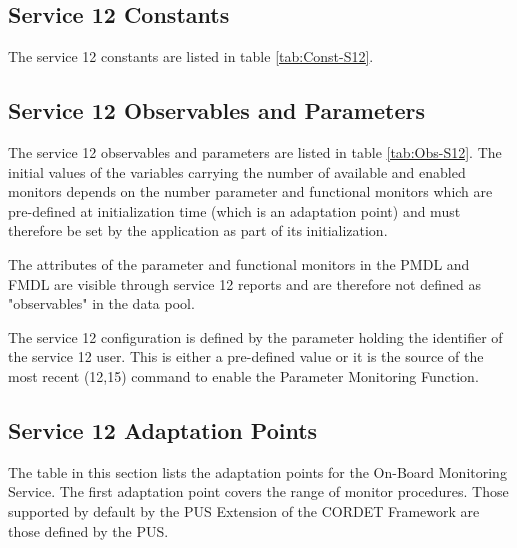 \documentclass{pnp_article}
\begin{document}
\subsection{Service 12 Constants}\label{sec:serv12Const}
The service 12 constants are listed in table \ref{tab:Const-S12}.    



\subsection{Service 12 Observables and Parameters}\label{sec:serv12ObsPar}
The service 12 observables and parameters are listed in table \ref{tab:Obs-S12}. The initial values of the variables carrying the number of available and enabled monitors depends on the number parameter and functional monitors which are pre-defined at initialization time (which is an adaptation point) and must therefore be set by the application as part of its initialization.

The attributes of the parameter and functional monitors in the PMDL and FMDL are visible through service 12 reports and are therefore not defined as "observables" in the data pool.

The service 12 configuration is defined by the parameter holding the identifier of the service 12 user. This is either a pre-defined value or it is the source of the most recent (12,15) command to enable the Parameter Monitoring Function.



\subsection{Service 12 Adaptation Points}
The table in this section lists the adaptation points for the On-Board Monitoring Service. The first adaptation point covers the range of monitor procedures. Those supported by default by the PUS Extension of the CORDET Framework are those defined by the PUS. 
\end{document}
